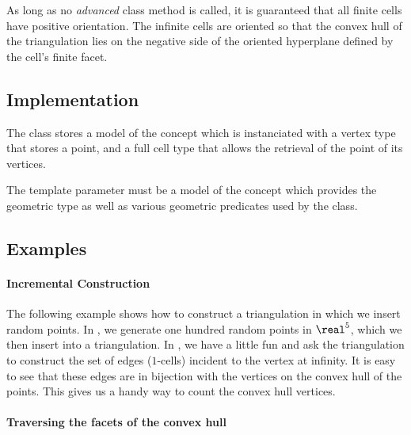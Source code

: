 As long as no \emph{advanced} class method is called, it is guaranteed that
all finite cells have positive orientation. The infinite cells are
oriented so that the convex hull of the triangulation lies on the negative side of
the oriented hyperplane defined by the cell's finite facet.



\subsection{Implementation}

The class  stores a model 
of the concept  which is instanciated with a
vertex type that stores a point, and a full cell type that allows the retrieval
of the point of its vertices.

The template parameter  must be a model of the concept
 which provides the geometric  type as well
as various geometric predicates used by the  class.


\subsection{Examples}

\paragraph{Incremental Construction}

The following example shows how to construct a triangulation in which we insert
random points. In , we generate one hundred random points in
$\real^5$, which we then insert into a triangulation. In , we have
a little fun and ask the triangulation to construct the set of edges
($1$-cells) incident to the vertex at infinity. It is easy to see that
these edges are in bijection with the vertices on the convex hull of the
points. This gives us a handy way to count the convex hull vertices.


\paragraph{Traversing the facets of the convex hull}

